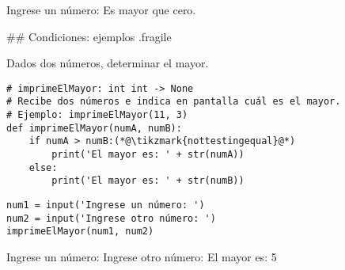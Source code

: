 

\begin{exampleConsole}
Ingrese un número: 
Es mayor que cero.
\end{exampleConsole}

\trmcolumns

## Condiciones: ejemplos {.fragile}

\bgnblockgood
Dados dos números, determinar el mayor.
\trmblockgood

\vspace{-1ex}
\begin{lstlisting}[style=frame02]
# imprimeElMayor: int int -> None
# Recibe dos números e indica en pantalla cuál es el mayor.
# Ejemplo: imprimeElMayor(11, 3)
def imprimeElMayor(numA, numB):
    if numA > numB:(*@\tikzmark{nottestingequal}@*)
        print('El mayor es: ' + str(numA))
    else:
        print('El mayor es: ' + str(numB))
\end{lstlisting}

\vspace{-2ex}

\bgncolumns
{}


\begin{lstlisting}
num1 = input('Ingrese un número: ')
num2 = input('Ingrese otro número: ')
imprimeElMayor(num1, num2)
\end{lstlisting}



\begin{exampleConsole}
Ingrese un número: 
Ingrese otro número: 
El mayor es: 5
\end{exampleConsole}

\trmcolumns

\pause


